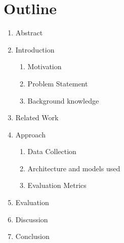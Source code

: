 \clearpage
\section{Outline}

{

  \begin{enumerate}
    \item Abstract
    \item Introduction
    \begin{enumerate}
      \item Motivation
      \item Problem Statement
      \item Background knowledge
    \end{enumerate}
    \item Related Work
    \item Approach
    \begin{enumerate}
      \item Data Collection
      \item Architecture and models used
      \item Evaluation Metrics
    \end{enumerate}
    \item Evaluation
    \item Discussion
    \item Conclusion
  \end{enumerate}
}

\clearpage

